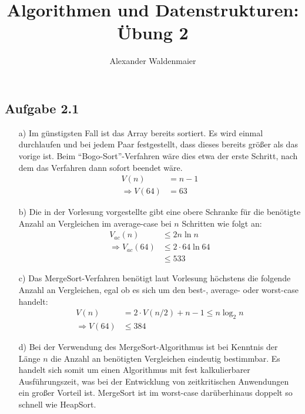 \documentclass{article}
\title{Algorithmen und Datenstrukturen: Übung 2}
\author{Alexander Waldenmaier}
\begin{document}
    \maketitle

    \subsection*{Aufgabe 2.1}
    \begin{enumerate}
        \item[a)] Im günstigsten Fall ist das Array bereits sortiert. Es wird einmal durchlaufen und bei jedem Paar festgestellt, dass dieses bereits größer als das vorige ist. Beim "`Bogo-Sort"'-Verfahren wäre dies etwa der erste Schritt, nach dem das Verfahren dann sofort beendet wäre. 
        \begin{align*}
            V(n) &= n -1 \\
            \Rightarrow V(64) &= 63
        \end{align*}
        \item[b)] Die in der Vorlesung vorgestellte gibt eine obere Schranke für die benötigte Anzahl an Vergleichen im average-case bei $n$ Schritten wie folgt an:
        \begin{align*}
            V_{ac}(n) &\le 2 n \ln n\\
            \Rightarrow V_{ac}(64) &\le 2\cdot 64 \ln 64\\
            &\le 533
        \end{align*}
        \item[c)] Das MergeSort-Verfahren benötigt laut Vorlesung höchstens die folgende Anzahl an Vergleichen, egal ob es sich um den best-, average- oder worst-case handelt:
        \begin{align*}
            V(n) &= 2\cdot V(n/2) + n - 1 \le n \log_2 n\\
            \Rightarrow V(64) &\le 384
        \end{align*}
        \item[d)] Bei der Verwendung des MergeSort-Algorithmus ist bei Kenntnis der Länge $n$ die Anzahl an benötigten Vergleichen eindeutig bestimmbar. Es handelt sich somit um einen Algorithmus mit fest kalkulierbarer Ausführungszeit, was bei der Entwicklung von zeitkritischen Anwendungen ein großer Vorteil ist. MergeSort ist im worst-case darüberhinaus doppelt so schnell wie HeapSort. 
    \end{enumerate}
\end{document}
